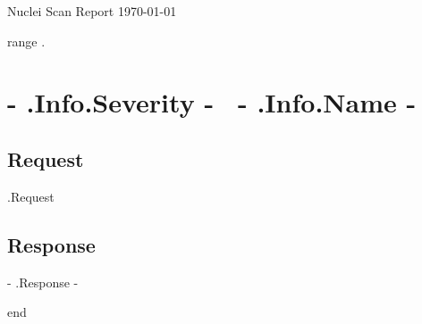 \documentclass{article}
\begin{document}

\begin{titlepage}
\begin{center}
{\huge Nuclei Scan Report}
\vfill
\large{\today}

\end{center}
\end{titlepage}


{{range .}}

	\section{ \colorbox{ {{- .Info.Severity -}} }{ {{- .Info.Severity -}} }~{{- .Info.Name -}} }

	\subsection{Request}
		{{.Request}} 

	\subsection{Response}
		{{- .Response -}}
 
{{end}}

\end{document}
